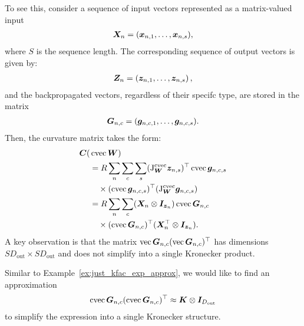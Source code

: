 To see this, consider a sequence of input vectors represented as a matrix-valued input 
\begin{align*}
  {\bm{X}}_n = ({\bm{x}}_{n, 1}, \dots, {\bm{x}}_{n, s}),
\end{align*} 
where $S$ is the sequence length.
The corresponding sequence of output vectors is given by:
\begin{align*}
{\bm{Z}}_n = \left( {\bm{z}}_{n, 1}, \dots, {\bm{z}}_{n,s} \right),
\end{align*}
and the backpropagated vectors, regardless of their specifc type, are stored in the matrix 
\begin{align*}
{\bm{G}}_{n, c} = ({\bm{g}}_{n, c, 1}, \dots, {\bm{g}}_{n, c, s}).
\end{align*}
Then, the curvature matrix takes the form:
\begin{align*}
  {\bm{C}}(&\operatorname{cvec} {\bm{W}})
  \\
  &=
    R
    \sum_n \sum_c \sum_s
    (\mathrm{J}^{\operatorname{cvec}}_{{\bm{W}}}{\bm{z}}_{n,s})^{\top}\operatorname{cvec}{\bm{g}}_{n,c,s}\\
 &\quad \times(\operatorname{cvec}{\bm{g}}_{n,c,s})^{\top}
   (\mathrm{J}^{\operatorname{cvec}}_{{\bm{W}}}{\bm{g}}_{n,c,s}) \\
 &=
   R
   \sum_n \sum_c ({\bm{X}}_n \otimes {\bm{I}}_{{\bm{z}}_n}) \operatorname{cvec} {\bm{G}}_{n,c}
 \\
 &\quad \times
 (\operatorname{cvec} {\bm{G}}_{n,c})^{\top}
   ({\bm{X}}_n^{\top} \otimes {\bm{I}}_{{\bm{z}}_n}).
\end{align*}
A key observation is that the matrix $\operatorname{vec}{\bm{G}}_{n,c} (\operatorname{vec}{\bm{G}}_{n,c})^{\top}$ has dimensions $S D_{\text{out}} \times S D_{\text{out}}$ and does not simplify into a single Kronecker product.

Similar to Example~\ref{ex:just_kfac_exp_approx}, we would like to find an approximation 
\begin{align*}
\operatorname{cvec}{\bm{G}}_{n,c} (\operatorname{cvec}{\bm{G}}_{n,c})^{\top} \approx {\bm{K}} \otimes {\bm{I}}_{D_\text{out}}
\end{align*}
to simplify the expression into a single Kronecker structure.

